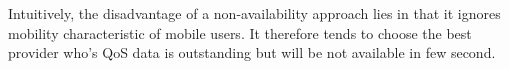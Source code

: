 \documentclass[10pt,journal,compsoc]{IEEEtran}
\begin{document}
Intuitively, the disadvantage of a non-availability approach lies in that it ignores mobility characteristic of mobile users. It therefore tends to choose the best provider who's QoS data is outstanding but will be not available in few second.










\end{document}
